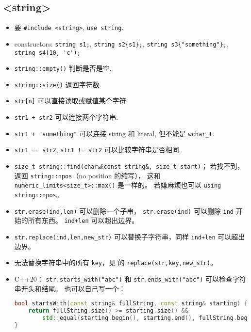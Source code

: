 \subsection{<string>}
\begin{itemize}
\item 要 \verb`#include <string>`, \verb`use string`.
\item constructors: \verb`string s1;`, \verb`string s2{s1};`, \verb`string s3{"something"};`, \verb`string s4(10, 'c');`
\item \verb`string::empty()` 判断是否是空.
\item \verb`string::size()` 返回字符数.
\item \verb`str[n]` 可以直接读取或赋值某个字符.
\item \verb`str1 + str2` 可以连接两个字符串.
\item \verb`str1 + "something"` 可以连接 string 和 literal, 但不能是 \verb`wchar_t`.
\item \verb`str1 == str2`, \verb`str1 != str2` 可以比较字符串是否相同.
\item \verb`size_t string::find(char或const string&, size_t start)`； 若找不到， 返回 \verb`string::npos`（no position 的缩写）， 这和 \verb`numeric_limits<size_t>::max()` 是一样的。 若嫌麻烦也可以 \verb`using string::npos`。
\item \verb`str.erase(ind,len)` 可以删除一个子串， \verb`str.erase(ind)` 可以删除 \verb`ind` 开始的所有东西。 \verb`ind+len` 可以超出边界。
\item \verb`str.replace(ind,len,new_str)` 可以替换子字符串，同样 \verb`ind+len` 可以超出边界。
\item 无法替换字符串中的所有 \verb`key`，见  的 \verb`replace(str,key,new_str)`。
\item C++20： \verb`str.starts_with("abc")` 和 \verb`str.ends_with("abc")` 可以检查字符串开头和结尾。 也可以自己写一个：
\begin{lstlisting}[language=cpp]
bool startsWith(const string& fullString, const string& starting) {
    return fullString.size() >= starting.size() &&
        std::equal(starting.begin(), starting.end(), fullString.begin());
}
\end{lstlisting}
\end{itemize}

